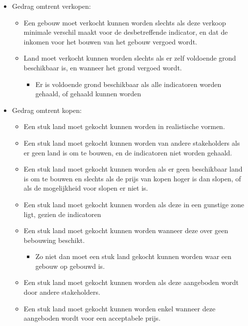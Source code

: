\begin{itemize}
	\item Gedrag omtrent verkopen:
	\begin{itemize}
		\item 	Een gebouw moet verkocht kunnen worden slechts als deze verkoop minimale verschil maakt voor de desbetreffende indicator, en dat de inkomen voor het bouwen van het gebouw vergoed wordt.
	\item	Land moet verkocht kunnen worden slechts als er zelf voldoende grond beschikbaar is, en wanneer het grond vergoed wordt.
	\begin{itemize}
		\item 	Er is voldoende grond beschikbaar als alle indicatoren worden gehaald, of gehaald kunnen worden
	\end{itemize}
		\end{itemize}

	\item Gedrag omtrent kopen:
	\begin{itemize}
		\item 	Een stuk land moet gekocht kunnen worden in realistische vormen.
		\item Een stuk land moet gekocht kunnen worden van andere stakeholders als er geen land is om te bouwen, en de indicatoren niet worden gehaald. 
		\item	Een stuk land moet gekocht kunnen worden als er geen beschikbaar land is om te bouwen en slechts als de prijs van kopen hoger is dan slopen, of als de mogelijkheid voor slopen er niet is.
	\item	Een stuk land moet gekocht kunnen worden als deze in een gunstige zone ligt, gezien de indicatoren
	\item	Een stuk land moet gekocht kunnen worden wanneer deze over geen bebouwing beschikt.
	\begin{itemize}
		\item Zo niet dan moet een stuk land gekocht kunnen worden waar een gebouw op gebouwd is.
	\end{itemize}		\item	Een stuk land moet gekocht kunnen worden als deze aangeboden wordt door andere stakeholders.
	\item	Een stuk land moet gekocht kunnen worden enkel wanneer deze aangeboden wordt voor een acceptabele prijs.
		

\end{itemize}
\end{itemize}

